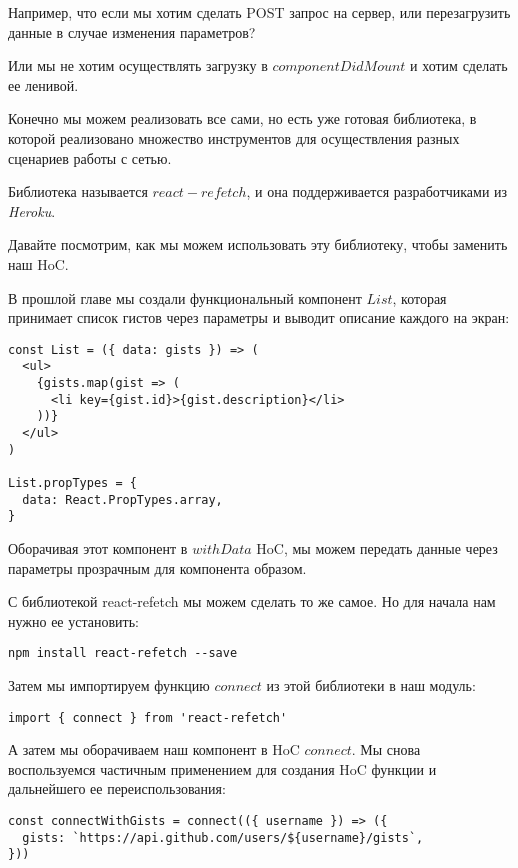 Например, что если мы хотим сделать POST запрос на сервер, или перезагрузить данные в случае изменения параметров?

Или мы не хотим осуществлять загрузку в $componentDidMount$ и хотим сделать ее ленивой.

Конечно мы можем реализовать все сами, но есть уже готовая библиотека, в которой реализовано множество инструментов для осуществления разных сценариев работы с сетью.

Библиотека называется $react-refetch$, и она поддерживается разработчиками из \textit{Heroku}.

Давайте посмотрим, как мы можем использовать эту библиотеку, чтобы заменить наш HoC.

В прошлой главе мы создали функциональный компонент $List$, которая принимает список гистов через параметры и выводит описание каждого на экран:

\begin{lstlisting}
const List = ({ data: gists }) => (
  <ul>
    {gists.map(gist => (
      <li key={gist.id}>{gist.description}</li>
    ))} 
  </ul>
)

List.propTypes = {
  data: React.PropTypes.array,
}
\end{lstlisting}

Оборачивая этот компонент в $withData$ HoC, мы можем передать данные через параметры прозрачным для компонента образом. 

С библиотекой react-refetch мы можем сделать то же самое. Но для начала нам нужно ее установить:

\begin{lstlisting}
npm install react-refetch --save
\end{lstlisting}

Затем мы импортируем функцию $connect$ из этой библиотеки в наш модуль:

\begin{lstlisting}
import { connect } from 'react-refetch'
\end{lstlisting}

А затем мы оборачиваем наш компонент в HoC $connect$. Мы снова воспользуемся частичным применением для создания HoC функции и дальнейшего ее переиспользования:

\begin{lstlisting}
const connectWithGists = connect(({ username }) => ({
  gists: `https://api.github.com/users/${username}/gists`,
}))
\end{lstlisting}

